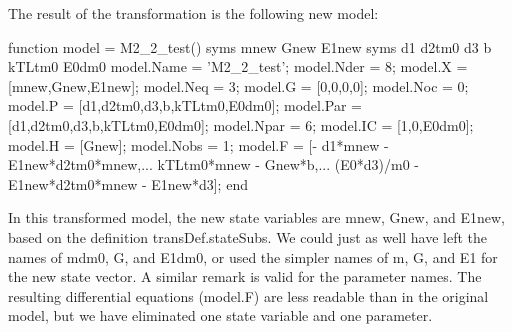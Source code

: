 The result of the transformation is the following new model\+:


\begin{DoxyCode}
\textcolor{keyword}{function} model = M2\_2\_test()
    syms mnew Gnew E1new
    syms d1 d2tm0 d3 b kTLtm0 E0dm0
    model.Name = 'M2\_2\_test';
    model.Nder = 8;
    model.X = [mnew,Gnew,E1new];
    model.Neq = 3;
    model.G = [0,0,0,0];
    model.Noc = 0;
    model.P = [d1,d2tm0,d3,b,kTLtm0,E0dm0];
    model.Par = [d1,d2tm0,d3,b,kTLtm0,E0dm0];
    model.Npar = 6;
    model.IC = [1,0,E0dm0];
    model.H = [Gnew];
    model.Nobs = 1;
    model.F = [- d1*mnew - E1new*d2tm0*mnew,...
               kTLtm0*mnew - Gnew*b,...
               (E0*d3)/m0 - E1new*d2tm0*mnew - E1new*d3];
end
\end{DoxyCode}


In this transformed model, the new state variables are mnew, Gnew, and E1new, based on the definition trans\+Def.\+state\+Subs. We could just as well have left the names of mdm0, G, and E1dm0, or used the simpler names of m, G, and E1 for the new state vector. A similar remark is valid for the parameter names. The resulting differential equations (model.\+F) are less readable than in the original model, but we have eliminated one state variable and one parameter. 